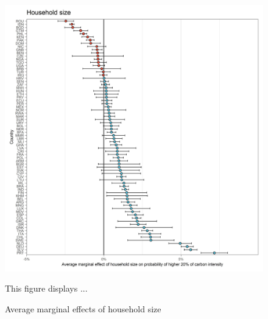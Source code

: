 \documentclass[12pt, a4paper]{article}
\newenvironment{subcaption}
{\strut
\vspace{-5pt}
\begin{minipage}[b]{0.9\textwidth}
  \hspace*{-\parindent}
  \footnotesize}
 {\end{minipage}}
\begin{document}
 \begin{figure}[ht!]
   \centering
   \caption{Average marginal effects of household size} \label{fig:F3_Size}
   \includegraphics{Analysis_Logit_Models_Marginal_Effects/Average_Marginal_Effects_affected_upper_80_hh_size}
   \begin{subcaption}
     This figure displays ...
   \end{subcaption}
 \end{figure}

 \clearpage
\end{document}
